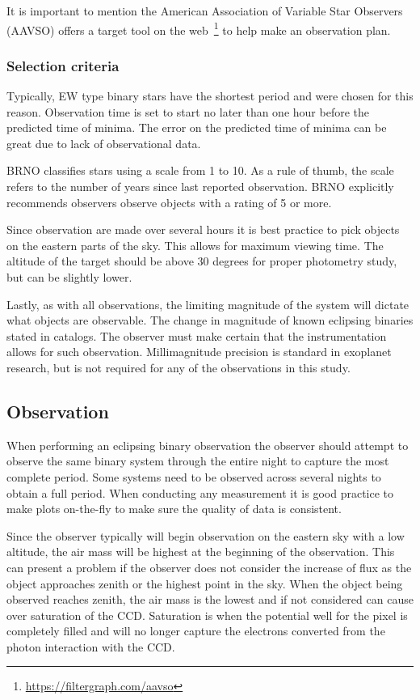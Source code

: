 It is important to mention the American Association of Variable Star Observers (AAVSO)
offers a target tool on the web~\footnote{\url{https://filtergraph.com/aavso}} to help make an observation plan.


\subsubsection{Selection criteria}
Typically, EW type binary stars have the shortest period and were chosen for this reason. 
Observation time is set to start no later than one hour before the predicted time of minima.
The error on the predicted time of minima can be great due to lack of observational data.

BRNO classifies stars using a scale from 1 to 10.
As a rule of thumb, the scale refers to the number of years since last reported observation.
BRNO explicitly recommends observers observe objects with a rating of 5 or more.

Since observation are made over several hours it is best practice to pick objects on the eastern parts of the sky.
This allows for maximum viewing time. The altitude of the target should be above 30 degrees for proper photometry study, but 
can be slightly lower.

Lastly, as with all observations, the limiting magnitude of the system will dictate what objects are observable.
The change in magnitude of known eclipsing binaries stated in catalogs.
The observer must make certain that the instrumentation allows for such observation.
Millimagnitude precision is standard in exoplanet research, but is not required for any of the observations in this study.

\subsection{Observation}
When performing an eclipsing binary observation the observer should attempt to observe 
the same binary system through the entire night to capture the most complete period. 
Some systems need to be observed across several nights to obtain a full period.
When conducting any measurement it is good practice to make plots on-the-fly to make sure the quality of data is consistent.

Since the observer typically will begin observation on the eastern sky with a low altitude, the air mass will be highest
at the beginning of the observation.
This can present a problem if the observer does not consider the increase of flux as the object approaches zenith or the highest
point in the sky.
When the object being observed reaches zenith, the air mass is the lowest and if not considered can cause over saturation of the CCD\@.
Saturation is when the potential well for the pixel is completely filled and will no longer capture the electrons
converted from the photon interaction with the CCD\@.

